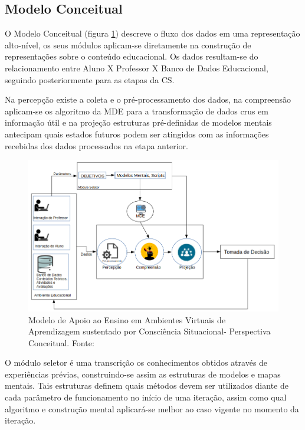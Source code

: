 \documentclass[
	oneside,
	12pt,				%
	a4paper,			%
	english,			%
	brazil,				%
	article
	]{abntex2}
\begin{document}
{\subsection{Modelo Conceitual}

O Modelo Conceitual (figura \ref{modeloSAemAVA}) descreve o fluxo dos dados em uma representação alto-nível, os seus módulos aplicam-se diretamente na construção de representações sobre o conteúdo educacional. Os dados resultam-se do relacionamento entre Aluno X Professor X Banco de Dados Educacional, seguindo posteriormente para as etapas da CS.

Na percepção existe a coleta e o pré-processamento dos dados, na compreensão aplicam-se os algoritmo da MDE para a transformação de dados crus em informação útil e na projeção estruturas pré-definidas de modelos mentais antecipam quais estados futuros podem ser atingidos com as informações recebidas dos dados processados na etapa anterior.

\begin{figure}[H]	
	\centering
	\includegraphics[scale=0.57]{teste_modelov02}
	\caption{Modelo de Apoio ao Ensino em Ambientes Virtuais de Aprendizagem sustentado por Consciência Situacional- Perspectiva Conceitual. Fonte: \cite{Martins2018} }
	\label{modeloSAemAVA}	
\end{figure}

O módulo seletor é uma transcrição os conhecimentos obtidos através de experiências prévias, construindo-se assim as estruturas de modelos e mapas mentais. Tais estruturas definem quais métodos devem ser utilizados diante de cada parâmetro de funcionamento no início de uma iteração, assim como qual algoritmo e construção mental aplicará-se melhor ao caso vigente no momento da iteração.

}
\end{document}
